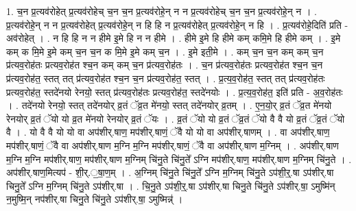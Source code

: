 \documentclass[17pt]{extarticle}
\begin{document}
1. च॒न प्र॒त्यव॑रोहेत् प्र॒त्यव॑रोहेच् च॒न च॒न प्र॒त्यव॑रोहे॒न् न न प्र॒त्यव॑रोहेच् च॒न च॒न प्र॒त्यव॑रोहे॒न् न । . प्र॒त्यव॑रोहे॒न् न न प्र॒त्यव॑रोहेत् प्र॒त्यव॑रोहे॒न् न हि हि न प्र॒त्यव॑रोहेत् प्र॒त्यव॑रोहे॒न् न हि । . प्र॒त्यव॑रोहे॒दिति॑ प्रति - अव॑रोहेत् । . न हि हि न न हीमे इ॒मे हि न न हीमे । . हीमे इ॒मे हि हीमे कम् कमि॒मे हि हीमे कम् । . इ॒मे कम् क मि॒मे इ॒मे कम् च॒न च॒न क मि॒मे इ॒मे कम् च॒न । . इ॒मे इती॒मे । . कम् च॒न च॒न कम् कम् च॒न प्र॑त्यव॒रोह॑तः प्रत्यव॒रोह॑त श्च॒न कम् कम् च॒न प्र॑त्यव॒रोह॑तः । . च॒न प्र॑त्यव॒रोह॑तः प्रत्यव॒रोह॑त श्च॒न च॒न प्र॑त्यव॒रोह॑त॒ स्तत् तत् प्र॑त्यव॒रोह॑त श्च॒न च॒न प्र॑त्यव॒रोह॑त॒ स्तत् । . प्र॒त्य॒व॒रोह॑त॒ स्तत् तत् प्र॑त्यव॒रोह॑तः प्रत्यव॒रोह॑त॒ स्तदे॑नयो रेनयो॒ स्तत् प्र॑त्यव॒रोह॑तः प्रत्यव॒रोह॑त॒ स्तदे॑नयोः । . प्र॒त्य॒व॒रोह॑त॒ इति॑ प्रति - अ॒व॒रोह॑तः । . तदे॑नयो रेनयो॒ स्तत् तदे॑नयोर् व्र॒तं ॅव्र॒त मे॑नयो॒ स्तत् तदे॑नयोर् व्र॒तम् । . ए॒न॒यो॒र् व्र॒तं ॅव्र॒त मे॑नयो रेनयोर् व्र॒तं ॅयो यो व्र॒त मे॑नयो रेनयोर् व्र॒तं ॅयः । . व्र॒तं ॅयो यो व्र॒तं ॅव्र॒तं ॅयो वै वै यो व्र॒तं ॅव्र॒तं ॅयो वै । . यो वै वै यो यो वा अप॑शीर्.षाण॒ मप॑शीर्.षाणं॒ ॅवै यो यो वा अप॑शीर्.षाणम् । . वा अप॑शीर्.षाण॒ मप॑शीर्.षाणं॒ ॅवै वा अप॑शीर्.षाण म॒ग्नि म॒ग्नि मप॑शीर्.षाणं॒ ॅवै वा अप॑शीर्.षाण म॒ग्निम् । . अप॑शीर्.षाण म॒ग्नि म॒ग्नि मप॑शीर्.षाण॒ मप॑शीर्.षाण म॒ग्निम् चि॑नु॒ते चि॑नु॒ते᳚ ऽग्नि मप॑शीर्.षाण॒ मप॑शीर्.षाण म॒ग्निम् चि॑नु॒ते । . अप॑शीर्.षाण॒मित्यप॑ - शी॒र्.॒षा॒ण॒म् । . अ॒ग्निम् चि॑नु॒ते चि॑नु॒ते᳚ ऽग्नि म॒ग्निम् चि॑नु॒ते ऽप॑शी॒र्॒.षा ऽप॑शीर्.षा चिनु॒ते᳚ ऽग्नि म॒ग्निम् चि॑नु॒ते ऽप॑शीर्.षा । . चि॒नु॒ते ऽप॑शी॒र्॒.षा ऽप॑शीर्.षा चिनु॒ते चि॑नु॒ते ऽप॑शीर्.षा॒ ऽमुष्मि॑न् न॒मुष्मि॒न् नप॑शीर्.षा चिनु॒ते चि॑नु॒ते ऽप॑शीर्.षा॒ ऽमुष्मिन्न्॑ । \newline
\end{document}

